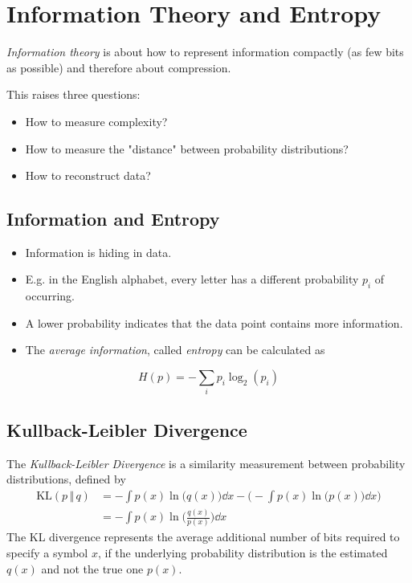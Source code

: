	\section{Information Theory and Entropy}
		\emph{Information theory} is about how to represent information compactly (as few bits as possible) and therefore about compression.

		This raises three questions:
		\begin{itemize}
			\item How to measure complexity?
			\item How to measure the "distance" between probability distributions?
			\item How to reconstruct data?
		\end{itemize}

		\subsection{Information and Entropy}
			\begin{itemize}
				\item Information is hiding in data.
				\item E.g. in the English alphabet, every letter has a different probability \(p_i\) of occurring.
				\item A lower probability indicates that the data point contains more information.
				\item The \emph{average information}, called \emph{entropy} can be calculated as
			\end{itemize}
			\begin{equation}
				H(p) = -\sum_{i} p_i \log_2(p_i)
			\end{equation}

		\subsection{Kullback-Leibler Divergence}
			The \emph{Kullback-Leibler Divergence} is a similarity measurement between probability distributions, defined by
			\begin{align}
				\textrm{KL}(p \,\Vert\, q) &= -\int p(x) \ln\big(q(x)\big) \dd{x} - \Bigg( -\int p(x) \ln\big(p(x)\big) \dd{x} \Bigg) \\
					&= -\int p(x) \ln\bigg(\frac{q(x)}{p(x)}\bigg) \dd{x}
			\end{align}
			The KL divergence represents the average additional number of bits required to specify a symbol \(x\), if the underlying probability distribution is the estimated \(q(x)\) and not the true one \(p(x)\).

